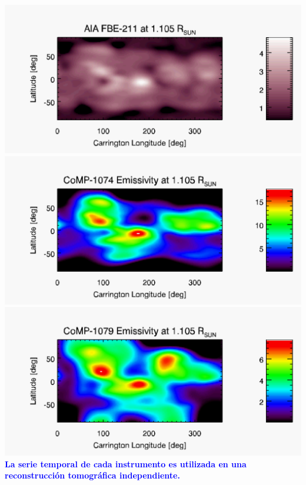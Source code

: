 \documentclass[a1,portrait,final]{baposter_old}
\def\azul#1{\textcolor{blue}{\bf\sf #1}}
\begin{document}
\begin{poster}
{{\begin{center}
\includegraphics[width=\columnwidth]{map_x_aia_211_1105_Rsun.pdf}\\
\includegraphics[width=\columnwidth]{map_x_comp1074_1105_Rsun.pdf}\\
\includegraphics[width=\columnwidth]{map_x_comp1079_1105_Rsun.pdf}
\vskip 0.1cm
\azul{La serie temporal de cada instrumento es utilizada en una reconstrucción tomográfica independiente.}
\end{center}
}
}
\end{poster}
\end{document}
